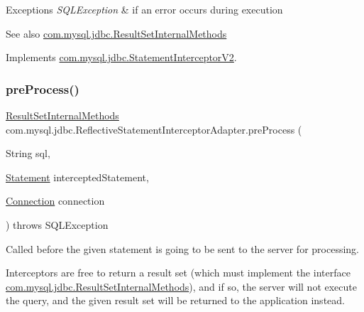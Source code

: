 \begin{DoxyExceptions}{Exceptions}
{\em S\+Q\+L\+Exception} & if an error occurs during execution\\
\hline
\end{DoxyExceptions}
\begin{DoxySeeAlso}{See also}
\mbox{\hyperlink{interfacecom_1_1mysql_1_1jdbc_1_1_result_set_internal_methods}{com.\+mysql.\+jdbc.\+Result\+Set\+Internal\+Methods}} 
\end{DoxySeeAlso}


Implements \mbox{\hyperlink{interfacecom_1_1mysql_1_1jdbc_1_1_statement_interceptor_v2_a6dadce27d32c6beaa303d46515307320}{com.\+mysql.\+jdbc.\+Statement\+Interceptor\+V2}}.

\mbox{\label{classcom_1_1mysql_1_1jdbc_1_1_reflective_statement_interceptor_adapter_afd1203522724452385bc67c8949586b3}} 
\subsubsection{\texorpdfstring{pre\+Process()}{preProcess()}}
{\footnotesize\ttfamily \mbox{\hyperlink{interfacecom_1_1mysql_1_1jdbc_1_1_result_set_internal_methods}{Result\+Set\+Internal\+Methods}} com.\+mysql.\+jdbc.\+Reflective\+Statement\+Interceptor\+Adapter.\+pre\+Process (\begin{DoxyParamCaption}\item[{String}]{sql,  }\item[{\mbox{\hyperlink{interfacecom_1_1mysql_1_1jdbc_1_1_statement}{Statement}}}]{intercepted\+Statement,  }\item[{\mbox{\hyperlink{interfacecom_1_1mysql_1_1jdbc_1_1_connection}{Connection}}}]{connection }\end{DoxyParamCaption}) throws S\+Q\+L\+Exception}

Called before the given statement is going to be sent to the server for processing.

Interceptors are free to return a result set (which must implement the interface \mbox{\hyperlink{interfacecom_1_1mysql_1_1jdbc_1_1_result_set_internal_methods}{com.\+mysql.\+jdbc.\+Result\+Set\+Internal\+Methods}}), and if so, the server will not execute the query, and the given result set will be returned to the application instead.

